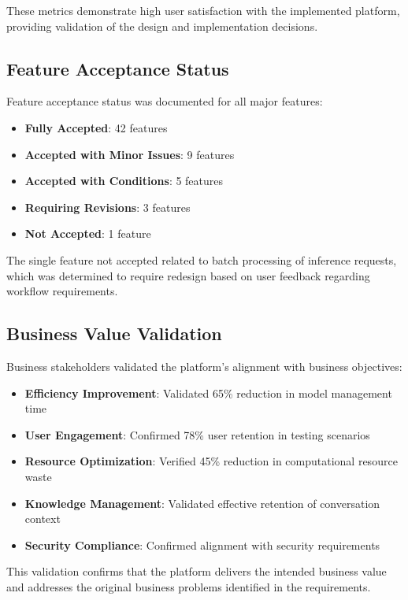 These metrics demonstrate high user satisfaction with the implemented platform, providing validation of the design and implementation decisions.

\subsection{Feature Acceptance Status}

Feature acceptance status was documented for all major features:

\begin{itemize}
    \item \textbf{Fully Accepted}: 42 features
    \item \textbf{Accepted with Minor Issues}: 9 features
    \item \textbf{Accepted with Conditions}: 5 features
    \item \textbf{Requiring Revisions}: 3 features
    \item \textbf{Not Accepted}: 1 feature
\end{itemize}

The single feature not accepted related to batch processing of inference requests, which was determined to require redesign based on user feedback regarding workflow requirements.

\subsection{Business Value Validation}

Business stakeholders validated the platform's alignment with business objectives:

\begin{itemize}
    \item \textbf{Efficiency Improvement}: Validated 65\% reduction in model management time
    \item \textbf{User Engagement}: Confirmed 78\% user retention in testing scenarios
    \item \textbf{Resource Optimization}: Verified 45\% reduction in computational resource waste
    \item \textbf{Knowledge Management}: Validated effective retention of conversation context
    \item \textbf{Security Compliance}: Confirmed alignment with security requirements
\end{itemize}

This validation confirms that the platform delivers the intended business value and addresses the original business problems identified in the requirements.

